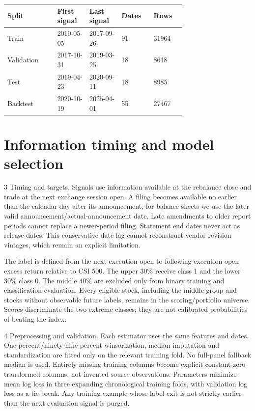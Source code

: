 \documentclass{article}
\begin{document}
{\small\begin{tabular}{p{.1\linewidth}p{0.18\linewidth}p{0.18\linewidth}p{0.18\linewidth}p{0.18\linewidth}}
\toprule
Split & First signal & Last signal & Dates & Rows \\ \midrule
Train & 2010-05-05 & 2017-09-26 & 91 & 31964 \\
Validation & 2017-10-31 & 2019-03-25 & 18 & 8618 \\
Test & 2019-04-23 & 2020-09-11 & 18 & 8985 \\
Backtest & 2020-10-19 & 2025-04-01 & 55 & 27467 \\
\bottomrule\end{tabular}}
\par{}\par
\clearpage
\section*{Information timing and model selection}
3 Timing and targets. Signals use information available at the rebalance close and trade at the next exchange session open. A filing becomes available no earlier than the calendar day after its announcement; for balance sheets we use the later valid announcement/actual-announcement date. Late amendments to older report periods cannot replace a newer-period filing. Statement end dates never act as release dates. This conservative date lag cannot reconstruct vendor revision vintages, which remain an explicit limitation.

The label is defined from the next execution-open to following execution-open excess return relative to CSI 500. The upper 30\% receive class 1 and the lower 30\% class 0. The middle 40\% are excluded only from binary training and classification evaluation. Every eligible stock, including the middle group and stocks without observable future labels, remains in the scoring/portfolio universe. Scores discriminate the two extreme classes; they are not calibrated probabilities of beating the index.

4 Preprocessing and validation. Each estimator uses the same features and dates. One-percent/ninety-nine-percent winsorization, median imputation and standardization are fitted only on the relevant training fold. No full-panel fallback median is used. Entirely missing training columns become explicit constant-zero transformed columns, not invented source observations. Parameters minimize mean log loss in three expanding chronological training folds, with validation log loss as a tie-break. Any training example whose label exit is not strictly earlier than the next evaluation signal is purged.
\end{document}
